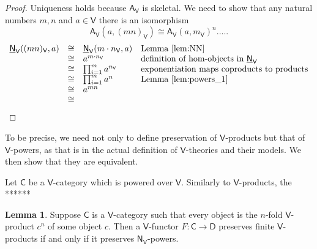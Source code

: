 \documentclass{amsart}
\theoremstyle{definition}
\newtheorem{lemma}[theorem]{Lemma}
\newcommand{\NN}{\mathsf{N}}
\newcommand{\A}{\mathsf{A}}
\newcommand{\V}{\mathsf{V}}
\newcommand{\D}{\mathsf{D}}
\newcommand{\C}{\mathsf{C}}
\newcommand{\maps}{\colon}
\begin{document}
\begin{proof}
Uniqueness holds because $\A_\V$ is skeletal.  We need to show 
that any natural numbers $m,n$ and $a \in \V$ there is an isomorphism
\[     \A_\V(a, (mn)_\V) \cong \A_\V(a,m_\V)^n  .....\]
\[\begin{array}{rcll}
	\underline{\NN}_\V((mn)_\V, a) & \cong & \underline{\NN}_\V(m \cdot n_\V,a) & \text{Lemma \ref{lem:NN}} \\
	&\cong &  a^{m \cdot n_\V} & \text{definition of hom-objects in $\underline{\NN}_\V$} \\
	&\cong & \prod_{i=1}^m a^{n_\V} & \text{exponentiation maps coproducts to products} \\
	&\cong & \prod_{i=1}^m a^n  & \text{Lemma \ref{lem:powers_1}} \\
	&\cong& a^{mn} \\
	&\cong& 
\end{array}
\]
\end{proof}	
\fi

To be precise, we need not only to define preservation of $\V$-products but that of $\V$-powers, as that is in the actual definition of $\V$-theories and their models. We then show that they are equivalent.

Let $\C$ be a $\V$-category which is powered over $\V$. Similarly to $\V$-products, the ******

\begin{lemma}
\label{lem:powers_3}
Suppose $\C$ is a $\V$-category such that every object is the $n$-fold $\V$-product $c^n$ of
some object $c$.   Then a $\V$-functor $F \maps \C \to \D$ preserves finite $\V$-products
if and only if it preserves $\NN_\V$-powers.
\end{lemma}
\end{document}
